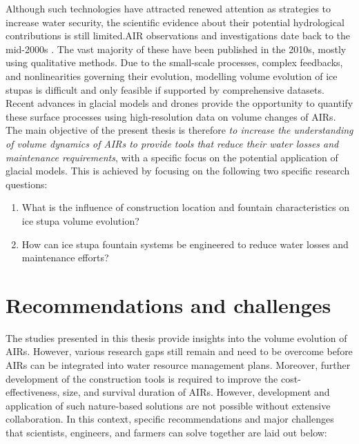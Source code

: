 Although such technologies have attracted renewed attention as strategies to increase water security, the scientific evidence about their potential hydrological contributions is still limited.\ac{AIR} observations and investigations
date back to the mid-2000s \citep{tveitenGlacierGrowingLocal2007}. The vast majority of these have been published in the
2010s, mostly using qualitative methods. Due to the small-scale processes, complex feedbacks, and nonlinearities
governing their evolution, modelling volume evolution of ice stupas is difficult and only feasible if supported
by comprehensive datasets. Recent advances in glacial models and drones provide the opportunity to quantify
these surface processes using high-resolution data on volume changes of \ac{AIRs}. The main objective of the present
thesis is therefore \textit{to increase the understanding of volume dynamics of \ac{AIRs} to provide tools
that reduce their water losses and maintenance requirements}, with a specific focus on the potential application
of glacial models. This is achieved by focusing on the following two specific research questions:

\begin{enumerate}
  \item{What is the influence of construction location and fountain characteristics on ice stupa volume
    evolution?}
  \item{How can ice stupa fountain systems be engineered to reduce water losses and maintenance efforts?}
\end{enumerate}


\section{Recommendations and challenges}

The studies presented in this thesis provide insights into the volume evolution of \ac{AIRs}. However, various research gaps still remain and need to be overcome before \ac{AIRs} can be integrated into water resource
management plans. Moreover, further development of the construction tools is required to improve the
cost-effectiveness, size, and survival duration of \ac{AIRs}. However, development and application of such
nature-based solutions are not possible without extensive collaboration. In this context,
specific recommendations and major challenges that scientists, engineers, and farmers can solve together are laid
out below:


